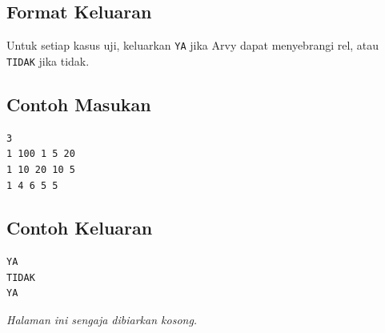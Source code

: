 \documentclass{article}
\begin{document}
\subsection*{Format Keluaran}
Untuk setiap kasus uji, keluarkan \lstinline{YA} jika Arvy dapat menyebrangi rel, atau \lstinline{TIDAK} jika tidak.

\begin{multicols}{2}
\subsection*{Contoh Masukan}
\begin{lstlisting}
3
1 100 1 5 20
1 10 20 10 5
1 4 6 5 5
\end{lstlisting}
\columnbreak
\subsection*{Contoh Keluaran}
\begin{lstlisting}
YA
TIDAK
YA
\end{lstlisting}
\vfill
\null
\end{multicols}

\newpage
\vspace*{\fill}
\begin{center}
    \textit{Halaman ini sengaja dibiarkan kosong.}
\end{center}
\vspace*{\fill}
\end{document}
